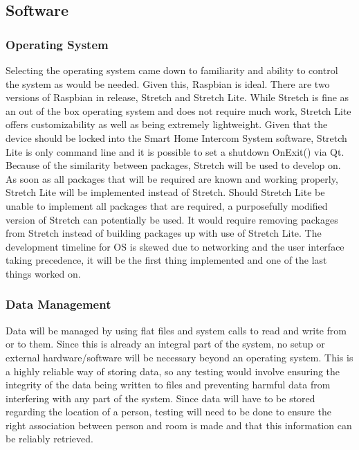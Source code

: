 \documentclass[onecolumn, draftclsnofoot,10pt, compsoc]{IEEEtran}
\begin{document}
\subsection{Software}
\subsubsection{Operating System}
Selecting the operating system came down to familiarity and ability to control the system as would be needed. Given this, Raspbian is ideal. There are two versions of Raspbian in release, Stretch and Stretch Lite. While Stretch is fine as an out of the box operating system and does not require much work, Stretch Lite offers customizability as well as being extremely lightweight. Given that the device should be locked into the Smart Home Intercom System software, Stretch Lite is only command line and it is possible to set a shutdown OnExit() via Qt. Because of the similarity between packages, Stretch will be used to develop on. As soon as all packages that will be required are known and working properly, Stretch Lite will be implemented instead of Stretch. Should Stretch Lite be unable to implement all packages that are required, a purposefully modified version of Stretch can potentially be used. It would require removing packages from Stretch instead of building packages up with use of Stretch Lite. The development timeline for OS is skewed due to networking and the user interface taking precedence, it will be the first thing implemented and one of the last things worked on.

\subsubsection{Data Management}
Data will be managed by using flat files and system calls to read and write from or to them. Since this is already an integral part of the system, no setup or external hardware/software will be necessary beyond an operating system. This is a highly reliable way of storing data, so any testing would involve ensuring the integrity of the data being written to files and preventing harmful data from interfering with any part of the system. Since data will have to be stored regarding the location of a person, testing will need to be done to ensure the right association between person and room is made and that this information can be reliably retrieved.
\end{document}
